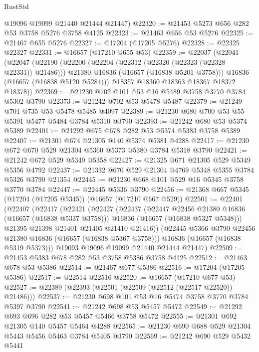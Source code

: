 \begin{lexlean}{RustStd}
\begin{coremodule}
      @19096
      @19099
      @21440
      @21444
      @21447)
@22320 := @21453 @5273 @656 @282 @53 @3758 @5276 @3758 @4125
@22323 := @21463 @656 @53 @5276
@22325 := @21467 @655 @5276
@22327 := @17204 (@17205 @5276)
@22328 := @22325 @22327
@22331 := @16657 (@17210 @655 @53)
@22359 := @22037
    (@22041
      (@22047
        (@22190
          (@22200
            (@22204 (@22312 (@22320 (@22323 (@22328 @22331)) @21486)))
            @21380
            @16836
            (@16657 (@16838 @5201 @3758)))
          @16836
          (@16657 (@16838 @5120 @5284)))
        @18357
        @18360
        @18363
        @18367
        @18372
        @18378))
@22369 := @21230 @702 @101 @53 @16 @5489 @3758 @3770 @3784 @5302 @3790
@22373 := @21242 @702 @53 @5478 @5487
@22379 := @21249 @701 @735 @53 @5478 @5485 @4097
@22389 := @21230 @680 @700 @53 @55 @5391 @5477 @5484 @3784 @5310 @3790
@22393 := @21242 @680 @53 @5374 @5389
@22401 := @21292 @675 @678 @282 @53 @5374 @5383 @3758 @5389
@22407 := @21301 @674 @21305 @140 @5374 @5381 @4288
@22417 := @21230 @672 @670 @529 @21304 @5360 @5373 @5380 @3784 @5318 @3790
@22421 := @21242 @672 @529 @5349 @5358
@22427 := @21325 @671 @21305 @529 @5349 @5356 @4792
@22437 := @21332 @670 @529 @21304 @4769 @5348 @5355 @3784 @5326 @3790 @21354
@22445 := @21230 @668 @101 @529 @16 @5345 @3758 @3770 @3784
@22447 := @22445 @5336 @3790
@22456 := @21368 @667 @5345 (@17204 (@17205 @5345)) (@16657 (@17210 @667 @529))
@22501 := @22401
    (@22407
      (@22417
        (@22421
          (@22427
            (@22437
              (@22447 @22456 @21380 @16836 (@16657 (@16838 @5337 @3758)))
              @16836
              (@16657 (@16838 @5327 @5348)))
            @21395
            @21398
            @21401
            @21405
            @21410
            @21416))
        (@22445 @5366 @3790 @22456 @21380 @16836 (@16657 (@16838 @5367 @3758)))
        @16836
        (@16657 (@16838 @5319 @5373)))
      @19093
      @19096
      @19099
      @21440
      @21444
      @21447)
@22509 := @21453 @5383 @678 @282 @53 @3758 @5386 @3758 @4125
@22512 := @21463 @678 @53 @5386
@22514 := @21467 @677 @5386
@22516 := @17204 (@17205 @5386)
@22517 := @22514 @22516
@22520 := @16657 (@17210 @677 @53)
@22527 := @22389 (@22393 (@22501 (@22509 (@22512 (@22517 @22520)) @21486)))
@22537 := @21230 @698 @101 @53 @16 @5474 @3758 @3770 @3784 @5397 @3790
@22541 := @21242 @698 @53 @5457 @5472
@22549 := @21292 @693 @696 @282 @53 @5457 @5466 @3758 @5472
@22555 := @21301 @692 @21305 @140 @5457 @5464 @4288
@22565 := @21230 @690 @688 @529 @21304 @5443 @5456 @5463 @3784 @5405 @3790
@22569 := @21242 @690 @529 @5432 @5441

\end{coremodule}
\end{lexlean}
